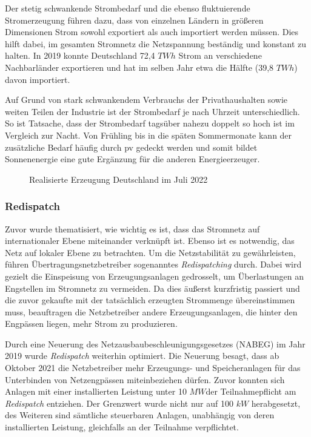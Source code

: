 \documentclass[12pt, a4paper]{article}
\begin{document}
Der stetig schwankende Strombedarf und die ebenso fluktuierende Stromerzeugung führen dazu, dass von einzelnen Ländern in größeren Dimensionen Strom sowohl exportiert als auch importiert werden müssen. Dies hilft dabei, im gesamten Stromnetz die Netzspannung beständig und konstant zu halten. In 2019 konnte Deutschland 72,4 $TWh$ Strom an verschiedene Nachbarländer exportieren und hat im selben Jahr etwa die Hälfte (39,8 $TWh$) davon importiert.

Auf Grund von stark schwankendem Verbrauchs der Privathaushalten sowie weiten Teilen der Industrie ist der Strombedarf je nach Uhrzeit unterschiedlich. So ist Tatsache, dass der Strombedarf tagsüber nahezu doppelt so hoch ist im Vergleich zur Nacht. Von Frühling bis in die späten Sommermonate kann der zusätzliche Bedarf häufig durch \ac{pv} gedeckt werden und somit bildet Sonnenenergie eine gute Ergänzung für die anderen Energieerzeuger. 


\begin{figure}
\centering
\def\svgwidth{450pt}
\fontsize{7}{10}\selectfont

\caption{Realisierte Erzeugung Deutschland im Juli 2022}
\label{fig:stromerzeugung_de_mai}
\end {figure}

\subsubsection{Redispatch}

Zuvor wurde thematisiert, wie wichtig es ist, dass das Stromnetz auf internationaler Ebene miteinander verknüpft ist. Ebenso ist es notwendig, das Netz auf lokaler Ebene zu betrachten. Um die Netzstabilität zu gewährleisten, führen Übertragungsnetzbetreiber sogenanntes \textit{Redispatching} durch. Dabei wird gezielt die Einspeisung von Erzeugungsanlagen gedrosselt, um Überlastungen an Engstellen im Stromnetz zu vermeiden. Da dies äußerst kurzfristig passiert und die zuvor gekaufte mit der tatsächlich erzeugten Strommenge übereinstimmen muss, beauftragen die Netzbetreiber andere Erzeugungsanlagen, die hinter den Engpässen liegen, mehr Strom zu produzieren.

Durch eine Neuerung des Netzausbaubeschleunigungsgesetzes (NABEG) im Jahr 2019 wurde \textit{Redispatch} weiterhin optimiert. Die Neuerung besagt, dass ab Oktober 2021 die Netzbetreiber mehr Erzeugungs- und Speicheranlagen für das Unterbinden von Netzengpässen miteinbeziehen dürfen. Zuvor konnten sich Anlagen mit einer installierten Leistung unter 10 $MW$der Teilnahmepflicht am \textit{Redispatch} entziehen. Der Grenzwert wurde nicht nur auf 100 $kW$ herabgesetzt, des Weiteren sind sämtliche steuerbaren Anlagen, unabhängig von deren installierten Leistung, gleichfalls an der Teilnahme verpflichtet.
\end{document}
